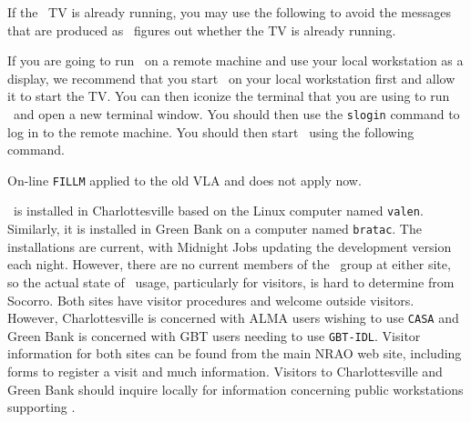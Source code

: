     If the \AIPS\ TV is already running, you may use the following to avoid
the messages that are produced as \AIPS\ figures out whether the TV is
already running.
\pd


    If you are going to run \AIPS\ on a remote machine and use your local
workstation as a display, we recommend that you start \AIPS\ on your local
workstation first and allow it to start the TV. You can then iconize the
terminal that you are using to run \AIPS\ and open a new terminal window.
You should then use the {\tt slogin} command to log in to the remote
machine. You should then start \AIPS\ using the following command.


    On-line {\tt FILLM} applied to the old VLA and does not apply now.


\AIPS\ is installed in Charlottesville based on the Linux computer
named {\tt valen}.  Similarly, it is installed in Green Bank on a
computer named {\tt bratac}.  The installations are current, with
Midnight Jobs updating the development version each night.  However,
there are no current members of the \AIPS\ group at either site, so
the actual state of \AIPS\ usage, particularly for visitors, is hard
to determine from Socorro.  Both sites have visitor procedures and
welcome outside visitors.  However, Charlottesville is concerned with
ALMA users wishing to use {\tt CASA} and Green Bank is concerned with
GBT users needing to use {\tt GBT-IDL}\@.  Visitor information for
both sites can be found from the main NRAO web site, including forms
to register a visit and much information.  Visitors to Charlottesville
and Green Bank should inquire locally for information concerning
public workstations supporting \AIPS\@.
